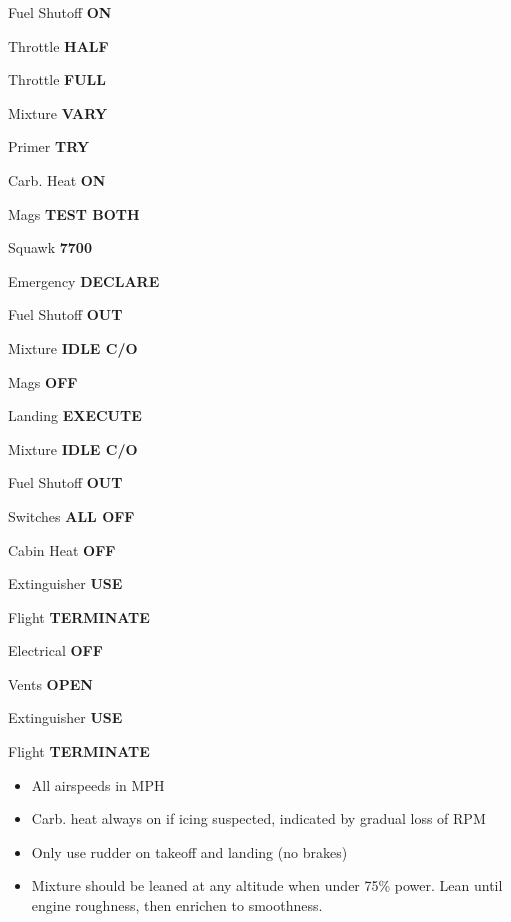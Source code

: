 \documentclass{article}
\begin{document}
\begin{multicols*}{3}
Fuel Shutoff \dotfill \textbf{ON}

Throttle \dotfill \textbf{HALF}

Throttle \dotfill \textbf{FULL}

Mixture \dotfill \textbf{VARY}

Primer \dotfill \textbf{TRY}

Carb. Heat \dotfill \textbf{ON}

Mags \dotfill \textbf{TEST BOTH}

\colorbox{orange!80}{}

Squawk \dotfill \textbf{7700}

Emergency \dotfill \textbf{DECLARE}

Fuel Shutoff \dotfill \textbf{OUT}

Mixture \dotfill \textbf{IDLE C/O}

Mags \dotfill \textbf{OFF}

Landing \dotfill \textbf{EXECUTE}

\colorbox{red!80}{}

Mixture \dotfill \textbf{IDLE C/O}

Fuel Shutoff \dotfill \textbf{OUT}

Switches \dotfill \textbf{ALL OFF}

Cabin Heat \dotfill \textbf{OFF}

Extinguisher \dotfill \textbf{USE}

Flight \dotfill \textbf{TERMINATE} \\

\colorbox{red!80}{}

Electrical \dotfill \textbf{OFF}

Vents \dotfill \textbf{OPEN}

Extinguisher \dotfill \textbf{USE}

\colorbox{orange!80}{}

Flight \dotfill \textbf{TERMINATE} \\

\colorbox{orange!80}{}

\begin{itemize}
\item All airspeeds in MPH

\item Carb. heat always on if icing suspected, indicated by gradual loss of RPM

\item Only use rudder on takeoff and landing (no brakes)

\item Mixture should be leaned at any altitude when under 75\% power. Lean until engine roughness, then enrichen to smoothness.
\end{itemize}

\end{multicols*}
\end{document}
